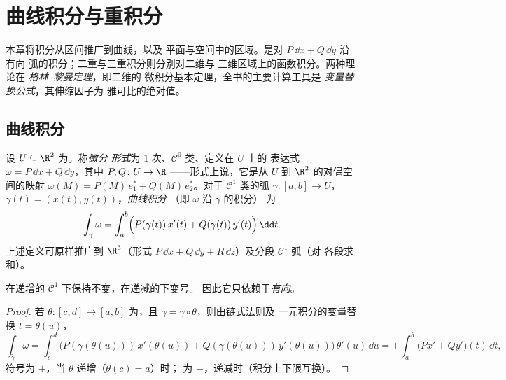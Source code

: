 \chapter{曲线积分与重积分}\label{ch:b2:multint}

本章将积分从区间推广到曲线，以及
平面与空间中的区域。是对
\emph{} $P\,\dd x + Q\,\dd y$ 沿有向
弧的积分；二重与三重积分则分别对二维与
三维区域上的函数积分。两种理论在
\emph{格林--黎曼定理}，即二维的
微积分基本定理，全书的主要计算工具是
\emph{变量替换公式}，其伸缩因子为
雅可比的绝对值。

\section{曲线积分}

\begin{definition}\label{def:b2:multint:lineint}
设 $U \subseteq \R^2$ 为。称\emph{微分
形式}为
$1$ 次、$\mathcal{C}^0$ 类、定义在 $U$ 上的
表达式 $\omega = P\,\dd x + Q\,\dd y$，其中 $P, Q \colon U \to \R$
——形式上说，它是从 $U$ 到
$\R^2$ 的对偶空间的映射 $\omega(M) = P(M)\,e_1^* + Q(M)\,e_2^*$。对于
$\mathcal{C}^1$ 类的弧 $\gamma \colon [a, b] \to U$，$\gamma(t) =
(x(t), y(t))$，\emph{曲线积分}
（即 $\omega$ 沿 $\gamma$ 的积分）
为
\[
\int_\gamma \omega
= \int_a^b \Bigl(P(\gamma(t))\,x'(t)
+ Q(\gamma(t))\,y'(t)\Bigr)\,\dd t .
\]
上述定义可原样推广到 $\R^3$（形式 $P\,\dd x +
Q\,\dd y + R\,\dd z$）及分段 $\mathcal{C}^1$ 弧（对
各段求和）。
\end{definition}

\begin{proposition}[不变性与定向]\label{prop:b2:multint:lineinv}
在递增的 $\mathcal{C}^1$
下保持不变，在递减的下变号。
因此它只依赖于\emph{有向}。
\end{proposition}

\begin{proof}
若 $\theta \colon [c, d] \to [a, b]$ 为，且
$\tilde\gamma = \gamma \circ \theta$，则由链式法则及
一元积分的变量替换 $t = \theta(u)$，
\[
\int_{\tilde\gamma}\omega
= \int_c^d \bigl(P(\gamma(\theta(u)))\,x'(\theta(u))
+ Q(\gamma(\theta(u)))\,y'(\theta(u))\bigr)\,\theta'(u)\,\dd u
= \pm\int_a^b \bigl(Px' + Qy'\bigr)(t)\,\dd t ,
\]
符号为 $+$，当 $\theta$ 递增（$\theta(c) = a$）时；
为 $-$，递减时（积分上下限互换）。
\end{proof}

